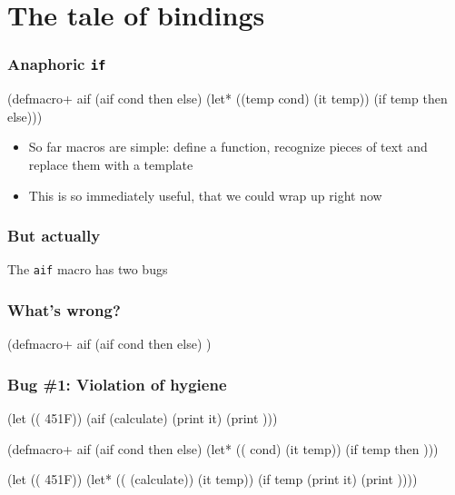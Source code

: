 \documentclass[hyperref={bookmarks=false}]{beamer}
\begin{document}
\section{The tale of bindings}

\begin{frame}[fragile]
\frametitle{Anaphoric \texttt{if}}
\begin{semiverbatim}
(defmacro+ aif
  (aif cond then else)
  (let* ((temp cond)
         (it temp))
    (if temp then else)))
\end{semiverbatim}

\begin{itemize}
\item So far macros are simple: define a function, recognize pieces of text and replace them with a template
\item This is so immediately useful, that we could wrap up right now
\end{itemize}
\end{frame}

\begin{frame}[fragile]
\frametitle{But actually}
The \texttt{aif} macro has two bugs
\end{frame}

\begin{frame}[fragile]
\frametitle{What's wrong?}
\begin{semiverbatim}

(defmacro+ aif
  (aif cond then else)
    )

\end{semiverbatim}
\end{frame}

\begin{frame}[fragile]
\frametitle{Bug \#1: Violation of hygiene}
\begin{semiverbatim}
(let ((\text{\color{blue}{temp}} 451{\textdegree}F))
  (aif (calculate)
    (print it)
    (print \text{\color{blue}{temp}})))

(defmacro+ aif
  (aif cond then else)
  (let* ((\text{\color{red}{temp}} cond)
         (it temp))
    (if temp then \text{\color{red}{else}})))

(let ((\text{\color{blue}{temp}} 451{\textdegree}F))
  (let* ((\text{\color{red}{temp}} (calculate))
         (it temp))
    (if temp
      (print it)
      (print \text{\color{red}{temp}}))))
\end{semiverbatim}
\end{frame}
\end{document}
